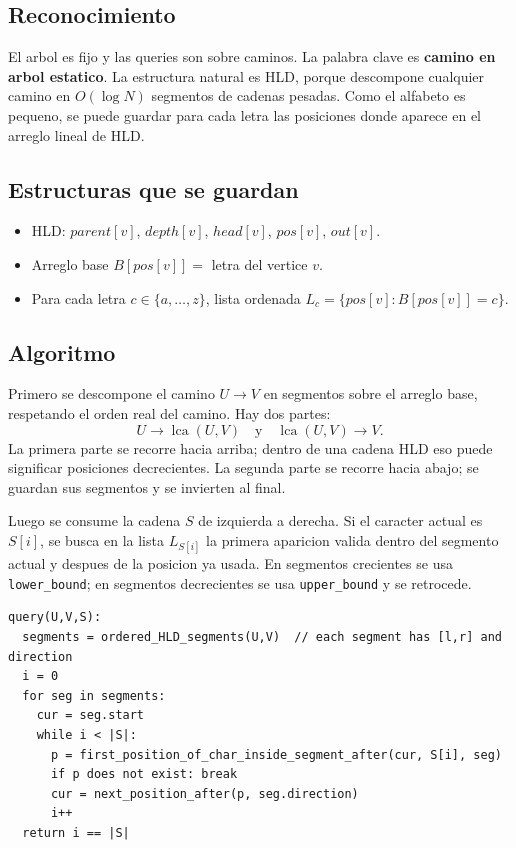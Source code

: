 \documentclass[10pt]{article}
\newcommand{\bigO}{O}
\newcommand{\lca}{\operatorname{lca}}
\begin{document}
\subsection{Reconocimiento}
El arbol es fijo y las queries son sobre caminos. La palabra clave es \textbf{camino en arbol estatico}.
La estructura natural es HLD, porque descompone cualquier camino en \(\bigO(\log N)\) segmentos de cadenas
pesadas. Como el alfabeto es pequeno, se puede guardar para cada letra las posiciones donde aparece en el
arreglo lineal de HLD.

\subsection{Estructuras que se guardan}
\begin{itemize}
\item HLD: \(parent[v]\), \(depth[v]\), \(head[v]\), \(pos[v]\), \(out[v]\).
\item Arreglo base \(B[pos[v]] =\) letra del vertice \(v\).
\item Para cada letra \(c\in\{a,\ldots,z\}\), lista ordenada \(L_c=\{pos[v] : B[pos[v]]=c\}\).
\end{itemize}

\subsection{Algoritmo}
Primero se descompone el camino \(U\to V\) en segmentos sobre el arreglo base, respetando el orden real
del camino. Hay dos partes:
\[
U \to \lca(U,V) \quad\text{y}\quad \lca(U,V)\to V.
\]
La primera parte se recorre hacia arriba; dentro de una cadena HLD eso puede significar posiciones
decrecientes. La segunda parte se recorre hacia abajo; se guardan sus segmentos y se invierten al final.

Luego se consume la cadena \(S\) de izquierda a derecha. Si el caracter actual es \(S[i]\), se busca en
la lista \(L_{S[i]}\) la primera aparicion valida dentro del segmento actual y despues de la posicion ya usada.
En segmentos crecientes se usa \texttt{lower\_bound}; en segmentos decrecientes se usa \texttt{upper\_bound}
y se retrocede.

\begin{lstlisting}
query(U,V,S):
  segments = ordered_HLD_segments(U,V)  // each segment has [l,r] and direction
  i = 0
  for seg in segments:
    cur = seg.start
    while i < |S|:
      p = first_position_of_char_inside_segment_after(cur, S[i], seg)
      if p does not exist: break
      cur = next_position_after(p, seg.direction)
      i++
  return i == |S|
\end{lstlisting}
\end{document}
